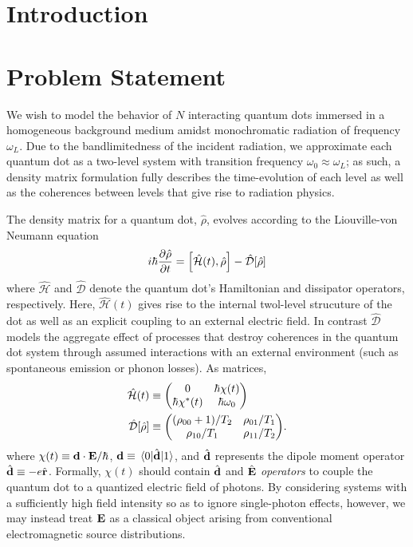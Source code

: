 \documentclass[conference]{IEEEtran}
\begin{document}
\IEEEpeerreviewmaketitle

\section{Introduction}


\section{Problem Statement}
We wish to model the behavior of $N$ interacting quantum dots immersed in a homogeneous background medium amidst monochromatic radiation of frequency $\omega_L$.
Due to the bandlimitedness of the incident radiation, we approximate each quantum dot as a two-level system with transition frequency $\omega_0 \approx \omega_L$; as such, a density matrix formulation fully describes the time-evolution of each level as well as the coherences between levels that give rise to radiation physics.

The density matrix for a quantum dot, $\hat{\rho}$, evolves according to the Liouville-von Neumann equation
\begin{equation}
  i \hbar \pdv{\hat{\rho}}{t} = \commutator{\hat{\mathcal{H}}(t)}{\hat{\rho}} - \hat{\mathcal{D}}\qty[\hat{\rho}]
  \label{eq:liouville}
\end{equation}
where $\hat{\mathcal{H}}$ and $\hat{\mathcal{D}}$ denote the quantum dot's Hamiltonian and dissipator operators, respectively.
Here, $\hat{\mathcal{H}}(t)$ gives rise to the internal twol-level strucuture of the dot as well as an explicit coupling to an external electric field.
In contrast $\hat{\mathcal{D}}$ models the aggregate effect of processes that destroy coherences in the quantum dot system through assumed interactions with an external environment (such as spontaneous emission or phonon losses).
As matrices,
\begin{subequations}
  \begin{align}
    \hat{\mathcal{H}}(t) &\equiv \mqty(0 & \hbar \chi(t) \\ \hbar \chi^*(t) & \hbar \omega_0) \label{eq:hamiltonian} \\
    \hat{\mathcal{D}}[\hat{\rho}] &\equiv \mqty((\rho_{00} + 1)/T_2 & \rho_{01}/T_1 \\ \rho_{10}/T_1 & \rho_{11}/T_2). \label{eq:dissipator}
  \end{align}
\end{subequations}
where $\chi(t) \equiv \vb{d} \cdot \vb{E}/\hbar$, $\vb{d} \equiv \matrixel{0}{\hat{\vb{d}}}{1}$, and $\hat{\vb{d}}$ represents the dipole moment operator $\hat{\vb{d}} \equiv -e \hat{\vb{r}}$. 
Formally, $\chi(t)$ should contain $\hat{\vb{d}}$ and $\hat{\vb{E}}$ \emph{operators} to couple the quantum dot to a quantized electric field of photons.
By considering systems with a sufficiently high field intensity so as to ignore single-photon effects, however, we may instead treat $\vb{E}$ as a classical object arising from conventional electromagnetic source distributions.
\end{document}
